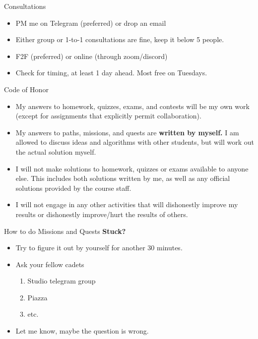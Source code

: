 \documentclass[10pt]{beamer}
\begin{document}
\begin{frame}[fragile]{Consultations}
  \begin{itemize}
    \item PM me on Telegram (preferred) or drop an email
    \item Either group or 1-to-1 consultations are fine, keep it below 5 people.
    \item F2F (preferred) or online (through zoom/discord)
    \item Check for timing, at least 1 day ahead. Most free on Tuesdays.
  \end{itemize}
\end{frame}

\begin{frame}[fragile]{Code of Honor}
  \begin{itemize}
    \item My answers to homework, quizzes, exams, and contests will be my own work (except for assignments that explicitly permit collaboration).
    \item My answers to paths, missions, and quests are \textbf{written by myself.} I am allowed to discuss ideas and algorithms with other students, but will work out the actual solution myself.
    \item I will not make solutions to homework, quizzes or exams available to anyone else. This includes both solutions written by me, as well as any official solutions provided by the course staff.
    \item I will not engage in any other activities that will dishonestly improve my results or dishonestly improve/hurt the results of others.
  \end{itemize}
\end{frame}

\begin{frame}[fragile]{How to do Missions and Quests}
  \textbf{Stuck?}
  \begin{itemize}
    \item Try to figure it out by yourself for another 30 minutes.
    \item Ask your fellow cadets
    \begin{enumerate}
      \item Studio telegram group
      \item Piazza
      \item etc.
    \end{enumerate}
    \item Let me know, maybe the question is wrong.
  \end{itemize}
\end{frame}
\end{document}
